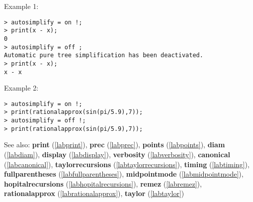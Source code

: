 \noindent Example 1: 
\begin{center}\begin{minipage}{15cm}\begin{Verbatim}[frame=single]
> autosimplify = on !;
> print(x - x);
0
> autosimplify = off ;
Automatic pure tree simplification has been deactivated.
> print(x - x);
x - x
\end{Verbatim}
\end{minipage}\end{center}
\noindent Example 2: 
\begin{center}\begin{minipage}{15cm}\begin{Verbatim}[frame=single]
> autosimplify = on !; 
> print(rationalapprox(sin(pi/5.9),7));
> autosimplify = off !; 
> print(rationalapprox(sin(pi/5.9),7));
\end{Verbatim}
\end{minipage}\end{center}
See also: \textbf{print} (\ref{labprint}), \textbf{prec} (\ref{labprec}), \textbf{points} (\ref{labpoints}), \textbf{diam} (\ref{labdiam}), \textbf{display} (\ref{labdisplay}), \textbf{verbosity} (\ref{labverbosity}), \textbf{canonical} (\ref{labcanonical}), \textbf{taylorrecursions} (\ref{labtaylorrecursions}), \textbf{timing} (\ref{labtiming}), \textbf{fullparentheses} (\ref{labfullparentheses}), \textbf{midpointmode} (\ref{labmidpointmode}), \textbf{hopitalrecursions} (\ref{labhopitalrecursions}), \textbf{remez} (\ref{labremez}), \textbf{rationalapprox} (\ref{labrationalapprox}), \textbf{taylor} (\ref{labtaylor})

